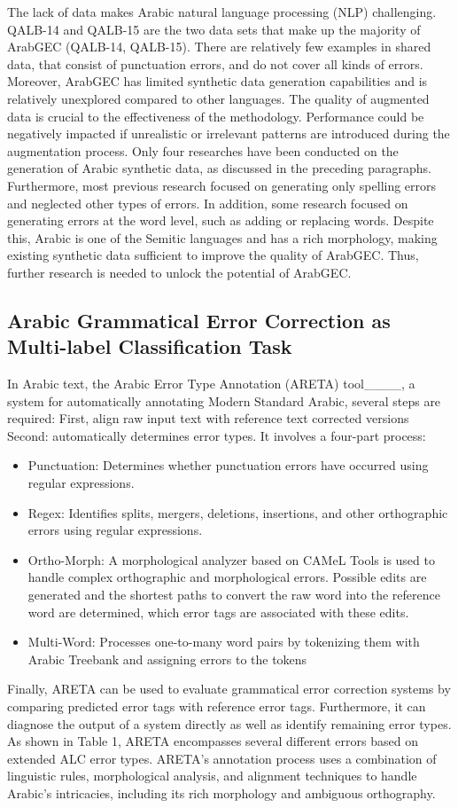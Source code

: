  The lack of data makes Arabic natural language processing (NLP) challenging. QALB-14 and QALB-15 are the two data sets that make up the majority of ArabGEC (QALB-14, QALB-15). There are relatively few examples in shared data, that consist of punctuation errors, and do not cover all kinds of errors. Moreover,  ArabGEC has limited synthetic data generation capabilities and is relatively unexplored compared to other languages. The quality of augmented data is crucial to the effectiveness of the methodology. Performance could be negatively impacted if unrealistic or irrelevant patterns are introduced during the augmentation process. Only four researches have been conducted on the generation of Arabic synthetic data, as discussed in the preceding paragraphs.  Furthermore, most previous research focused on generating only spelling errors and neglected other types of errors. In addition, some research focused on generating errors at the word level, such as adding or replacing words. Despite this, Arabic is one of the Semitic languages and has a rich morphology, making existing synthetic data sufficient to improve the quality of ArabGEC. Thus, further research is needed to unlock the potential of ArabGEC.
 \subsection{Arabic Grammatical Error Correction as Multi-label Classification Task}
 In Arabic text, the Arabic Error Type Annotation (ARETA) tool____, a system for automatically annotating Modern Standard Arabic, several steps are required: First, align raw input text with reference text corrected versions
Second: automatically determines error types. It involves a four-part process:
\begin{itemize}[noitemsep, topsep=0pt]
\item Punctuation: Determines whether punctuation errors have occurred using regular expressions.
\item Regex: Identifies splits, mergers, deletions, insertions, and other orthographic errors using regular expressions.
\item Ortho-Morph: A morphological analyzer based on CAMeL Tools is used to handle complex orthographic and morphological errors. Possible edits are generated and the shortest paths to convert the raw word into the reference word are determined, which error tags are associated with these edits.
\item Multi-Word: Processes one-to-many word pairs by tokenizing them with Arabic Treebank and assigning errors to the tokens
\end{itemize}
Finally, ARETA can be used to evaluate grammatical error correction systems by comparing predicted error tags with reference error tags. Furthermore, it can diagnose the output of a system directly as well as identify remaining error types.
As shown in Table 1, ARETA encompasses several different errors based on extended ALC error types. ARETA's annotation process uses a combination of linguistic rules, morphological analysis, and alignment techniques to handle Arabic's intricacies, including its rich morphology and ambiguous orthography.

